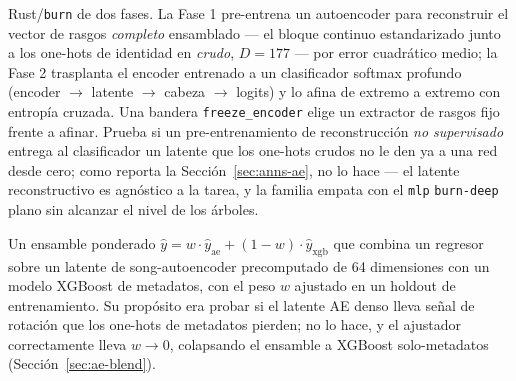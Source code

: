 \documentclass[11pt]{article}
\begin{document}
\begin{description}
  Rust/\texttt{burn} de dos fases. La Fase 1 pre-entrena un autoencoder para
  reconstruir el vector de rasgos \emph{completo} ensamblado --- el bloque
  continuo estandarizado junto a los one-hots de identidad en \emph{crudo},
  $D{=}177$ --- por error cuadrático medio; la Fase 2 trasplanta el encoder
  entrenado a un clasificador softmax profundo (encoder $\to$ latente $\to$
  cabeza $\to$ logits) y lo afina de extremo a extremo con entropía cruzada. Una
  bandera \texttt{freeze\_encoder} elige un extractor de rasgos fijo frente a
  afinar. Prueba si un pre-entrenamiento de reconstrucción \emph{no supervisado}
  entrega al clasificador un latente que los one-hots crudos no le den ya a una
  red desde cero; como reporta la Sección~\ref{sec:anns-ae}, no lo hace --- el
  latente reconstructivo es agnóstico a la tarea, y la familia empata con el
  \texttt{mlp} \texttt{burn-deep} plano sin alcanzar el nivel de los árboles.
  \item[Blend Autoencoder-XGBoost (\texttt{autoencoder-xgboost}).] Un ensamble
  ponderado $\hat{y}=w\cdot\hat{y}_{\text{ae}}+(1-w)\cdot\hat{y}_{\text{xgb}}$
  que combina un regresor sobre un latente de song-autoencoder precomputado de
  64 dimensiones con un modelo XGBoost de metadatos, con el peso $w$ ajustado en
  un holdout de entrenamiento. Su propósito era probar si el latente AE denso
  lleva señal de rotación que los one-hots de metadatos pierden; no lo hace, y el
  ajustador correctamente lleva $w\to 0$, colapsando el ensamble a XGBoost
  solo-metadatos (Sección~\ref{sec:ae-blend}).
\end{description}
\end{document}
